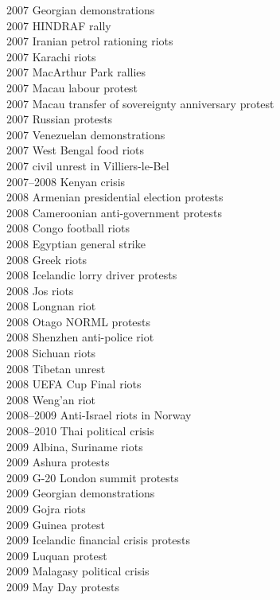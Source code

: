 2007 Georgian demonstrations\\
2007 HINDRAF rally\\
2007 Iranian petrol rationing riots\\
2007 Karachi riots\\
2007 MacArthur Park rallies\\
2007 Macau labour protest\\
2007 Macau transfer of sovereignty anniversary protest\\
2007 Russian protests\\
2007 Venezuelan demonstrations\\
2007 West Bengal food riots\\
2007 civil unrest in Villiers-le-Bel\\
2007–2008 Kenyan crisis\\
2008 Armenian presidential election protests\\
2008 Cameroonian anti-government protests\\
2008 Congo football riots\\
2008 Egyptian general strike\\
2008 Greek riots\\
2008 Icelandic lorry driver protests\\
2008 Jos riots\\
2008 Longnan riot\\
2008 Otago NORML protests\\
2008 Shenzhen anti-police riot\\
2008 Sichuan riots\\
2008 Tibetan unrest\\
2008 UEFA Cup Final riots\\
2008 Weng'an riot\\
2008–2009 Anti-Israel riots in Norway\\
2008–2010 Thai political crisis\\
2009 Albina, Suriname riots\\
2009 Ashura protests\\
2009 G-20 London summit protests\\
2009 Georgian demonstrations\\
2009 Gojra riots\\
2009 Guinea protest\\
2009 Icelandic financial crisis protests\\
2009 Luquan protest\\
2009 Malagasy political crisis\\
2009 May Day protests\\
